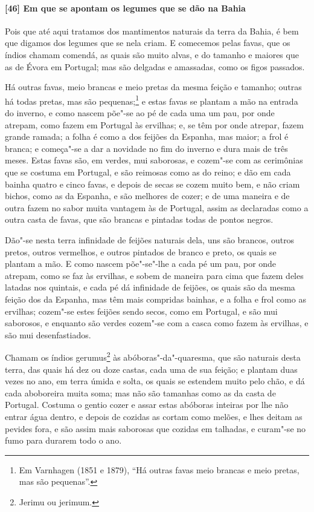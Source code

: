 \begin{linenumbers}
\paragraph{[46] Em que se apontam os legumes que se dão na Bahia}\quad
Pois que até aqui tratamos dos mantimentos naturais da terra da Bahia, é bem que digamos
dos legumes que se nela criam. E comecemos pelas favas, que os índios chamam comendá, as
quais são muito alvas, e do tamanho e maiores que as de Évora em Portugal; mas são
delgadas e amassadas, como os figos passados.

Há outras favas, meio brancas e meio pretas da mesma feição e tamanho; outras há todas
pretas, mas são pequenas;\footnote{ Em Varnhagen (1851 e 1879), ``Há outras favas meio
brancas e meio pretas, mas são pequenas''.} e estas favas se plantam a mão na entrada do
inverno, e como nascem põe"-se ao pé de cada uma um pau, por onde atrepam, como fazem em
Portugal às ervilhas; e, se têm por onde atrepar, fazem grande ramada; a folha é como a
dos feijões da Espanha, mas maior; a frol é branca; e começa"-se a dar a novidade no fim do
inverno e dura mais de três meses. Estas favas são, em verdes, mui saborosas, e cozem"-se
com as cerimônias que se costuma em Portugal, e são reimosas como as do reino; e dão em
cada bainha quatro e cinco favas, e depois de secas se cozem muito bem, e não criam
bichos, como as da Espanha, e são melhores de cozer; e de uma maneira e de outra fazem no
sabor muita vantagem às de Portugal, assim as declaradas como a outra casta de favas, que
são brancas e pintadas todas de pontos negros.

Dão"-se nesta terra infinidade de feijões naturais dela, uns são brancos, outros pretos,
outros vermelhos, e outros pintados de branco e preto, os quais se plantam a mão. E como
nascem põe"-se"-lhe a cada pé um pau, por onde atrepam, como se faz às ervilhas, e sobem de
maneira para cima que fazem deles latadas nos quintais, e cada pé dá infinidade de
feijões, os quais são da mesma feição dos da Espanha, mas têm mais compridas bainhas, e a
folha e frol como as ervilhas; cozem"-se estes feijões sendo secos, como em Portugal, e são
mui saborosos, e enquanto são verdes cozem"-se com a casca como fazem às ervilhas, e são
mui desenfastiados.

Chamam os índios gerumus\footnote{ Jerimu ou jerimum.} às abóboras"-da"-quaresma, que são
naturais desta terra, das quais há dez ou doze castas, cada uma de sua feição; e plantam
duas vezes no ano, em terra úmida e solta, os quais se estendem muito pelo chão, e dá cada
aboboreira muita soma; mas não são tamanhas como as da casta de Portugal. Costuma o gentio
cozer e assar estas abóboras inteiras por lhe não entrar água dentro, e depois de cozidas
as cortam como melões, e lhes deitam as pevides fora, e são assim mais saborosas que
cozidas em talhadas, e curam"-se no fumo para durarem todo o ano.


\end{linenumbers}
